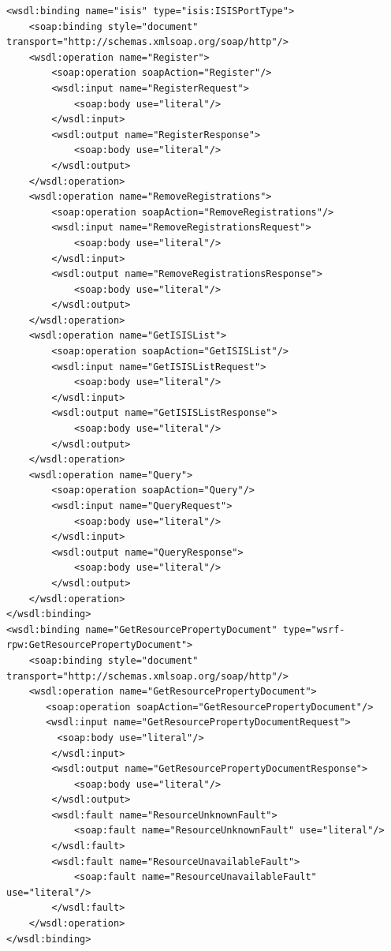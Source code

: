 \documentclass{book}
\begin{document}
\begin{verbatim}
<wsdl:binding name="isis" type="isis:ISISPortType">
    <soap:binding style="document" transport="http://schemas.xmlsoap.org/soap/http"/>
    <wsdl:operation name="Register">
        <soap:operation soapAction="Register"/>
        <wsdl:input name="RegisterRequest">
            <soap:body use="literal"/>
        </wsdl:input>
        <wsdl:output name="RegisterResponse">
            <soap:body use="literal"/>
        </wsdl:output>
    </wsdl:operation>
    <wsdl:operation name="RemoveRegistrations">
        <soap:operation soapAction="RemoveRegistrations"/>
        <wsdl:input name="RemoveRegistrationsRequest">
            <soap:body use="literal"/>
        </wsdl:input>
        <wsdl:output name="RemoveRegistrationsResponse">
            <soap:body use="literal"/>
        </wsdl:output>
    </wsdl:operation>
    <wsdl:operation name="GetISISList">
        <soap:operation soapAction="GetISISList"/>
        <wsdl:input name="GetISISListRequest">
            <soap:body use="literal"/>
        </wsdl:input>
        <wsdl:output name="GetISISListResponse">
            <soap:body use="literal"/>
        </wsdl:output>
    </wsdl:operation>
    <wsdl:operation name="Query">
        <soap:operation soapAction="Query"/>
        <wsdl:input name="QueryRequest">
            <soap:body use="literal"/>
        </wsdl:input>
        <wsdl:output name="QueryResponse">
            <soap:body use="literal"/>
        </wsdl:output>
    </wsdl:operation>
</wsdl:binding>
<wsdl:binding name="GetResourcePropertyDocument" type="wsrf-rpw:GetResourcePropertyDocument">
    <soap:binding style="document" transport="http://schemas.xmlsoap.org/soap/http"/>
    <wsdl:operation name="GetResourcePropertyDocument">
       <soap:operation soapAction="GetResourcePropertyDocument"/>
       <wsdl:input name="GetResourcePropertyDocumentRequest">
         <soap:body use="literal"/>
        </wsdl:input>
        <wsdl:output name="GetResourcePropertyDocumentResponse">
            <soap:body use="literal"/>
        </wsdl:output>
        <wsdl:fault name="ResourceUnknownFault">
            <soap:fault name="ResourceUnknownFault" use="literal"/>
        </wsdl:fault>
        <wsdl:fault name="ResourceUnavailableFault">
            <soap:fault name="ResourceUnavailableFault" use="literal"/>
        </wsdl:fault>
    </wsdl:operation>
</wsdl:binding>


\end{verbatim}
\end{document}
